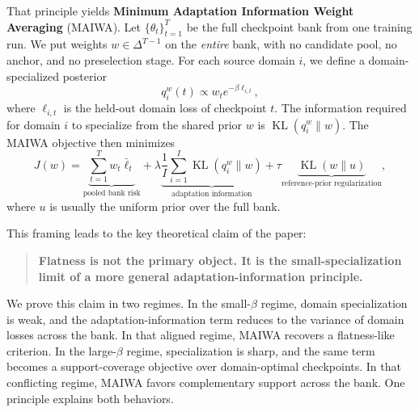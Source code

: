 \documentclass{article}
\newcommand{\KL}{\operatorname{KL}}
\newcommand{\simplex}{\Delta}
\newcommand{\maiwa}{\textup{\textsc{MAIWA}}}
\begin{document}
That principle yields \textbf{Minimum Adaptation Information Weight Averaging} (\maiwa{}). Let \(\{\theta_t\}_{t=1}^{T}\) be the full checkpoint bank from one training run. We put weights \(w \in \simplex^{T-1}\) on the \emph{entire} bank, with no candidate pool, no anchor, and no preselection stage. For each source domain \(i\), we define a domain-specialized posterior
\begin{equation}
    q_i^w(t) \propto w_t e^{-\beta \ell_{i,t}},
\end{equation}
where \(\ell_{i,t}\) is the held-out domain loss of checkpoint \(t\). The information required for domain \(i\) to specialize from the shared prior \(w\) is \(\KL(q_i^w\|w)\). The \maiwa{} objective then minimizes
\begin{equation}
    J(w) = \underbrace{\sum_{t=1}^{T} w_t \bar \ell_t}_{\text{pooled bank risk}}
    + \lambda \underbrace{\frac{1}{I}\sum_{i=1}^{I}\KL(q_i^w\|w)}_{\text{adaptation information}}
    + \tau \underbrace{\KL(w\|u)}_{\text{reference-prior regularization}},
\end{equation}
where \(u\) is usually the uniform prior over the full bank.

This framing leads to the key theoretical claim of the paper:
\begin{quote}
\textbf{Flatness is not the primary object. It is the small-specialization limit of a more general adaptation-information principle.}
\end{quote}
We prove this claim in two regimes. In the small-\(\beta\) regime, domain specialization is weak, and the adaptation-information term reduces to the variance of domain losses across the bank. In that aligned regime, \maiwa{} recovers a flatness-like criterion. In the large-\(\beta\) regime, specialization is sharp, and the same term becomes a support-coverage objective over domain-optimal checkpoints. In that conflicting regime, \maiwa{} favors complementary support across the bank. One principle explains both behaviors.
\end{document}
